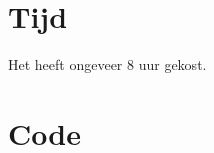 \documentclass[10pt]{article}
\begin{document}
\section{Tijd}
Het heeft ongeveer 8 uur gekost.

\section{Code}\label{sec:code}

\end{document}
